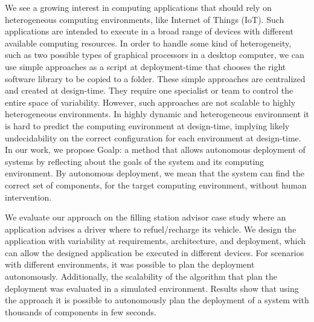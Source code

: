 We see a growing interest in computing applications that should rely on heterogeneous computing environments, like Internet of Things (IoT).
Such applications are intended to execute in a broad range of devices with different available computing resources.
In order to handle some kind of heterogeneity, such as two possible types of graphical processors in a desktop computer, we can use simple approaches as a script at deployment-time that chooses the right software library to be copied to a folder.
These simple approaches are centralized and created at design-time. They require one specialist or team to control the entire space of variability.
However, such approaches are not scalable to highly heterogeneous environments.
In highly dynamic and heterogeneous environment it is hard to predict the computing environment at design-time, implying likely undecidability on the correct configuration for each environment at design-time.
In our work, we propose Goalp: a method that allows autonomous deployment of systems by reflecting about the goals of the system and its computing environment. By autonomous deployment, we mean that the system can find the correct set of components, for the target computing environment, without human intervention.

We evaluate our approach on the filling station advisor case study where an application advises a driver where to refuel/recharge its vehicle. We design the application with variability at requirements, architecture, and deployment, which can allow the designed application be executed in different devices. For scenarios with different environments, it was possible to plan the deployment autonomously. Additionally, the scalability of the algorithm that plan the deployment was evaluated in a simulated environment. Results show that using the approach it is possible to autonomously plan the deployment of a system with thousands of components in few seconds.
